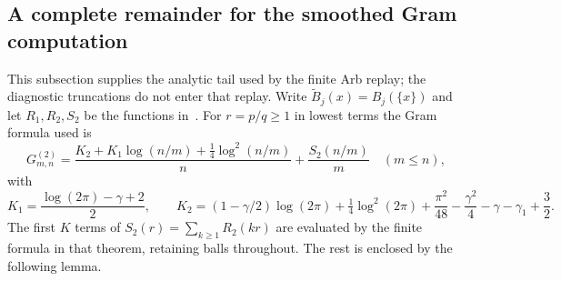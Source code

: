 \subsection{A complete remainder for the smoothed Gram computation}
\label{sec:ns61-gram-remainder}

This subsection supplies the analytic tail used by the finite Arb replay;
the diagnostic truncations do not enter that replay. Write
$\widetilde B_j(x)=B_j(\{x\})$ and let $R_1,R_2,S_2$ be the
functions in~\cite[Theorem 2.1]{Ehm2024}. For $r=p/q\geq1$ in lowest
terms the Gram formula used is
\[
 G^{(2)}_{m,n}=\frac{K_2+K_1\log(n/m)+\tfrac14\log^2(n/m)}n
                  +\frac{S_2(n/m)}m\quad(m\leq n),
\]
with
\[
 K_1=\frac{\log(2\pi)-\gamma+2}{2},\qquad
 K_2=(1-\gamma/2)\log(2\pi)+\tfrac14\log^2(2\pi)
       +\frac{\pi^2}{48}-\frac{\gamma^2}{4}-\gamma-\gamma_1+\frac32.
\]
The first $K$ terms of $S_2(r)=\sum_{k\geq1}R_2(kr)$ are evaluated
by the finite formula in that theorem, retaining balls throughout.
The rest is enclosed by the following lemma.

